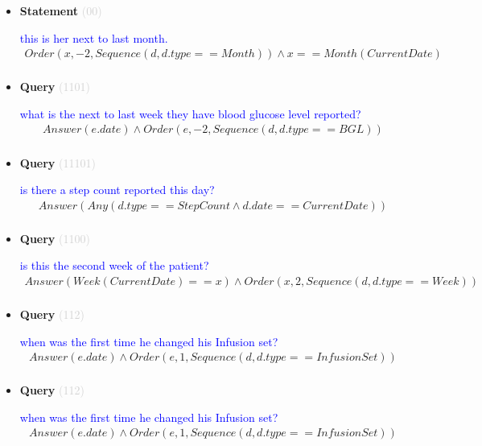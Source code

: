 \documentclass[11pt]{article}
\newcommand{\key}[1]{\textcolor{lightgray}{#1}}
\newcounter{CQuery}
\newcounter{CStatement}
\begin{document}
\begin{itemize}
\item
\textbf{Statement\theCStatement} \key{(00)} \addtocounter{CStatement}{1}
\textcolor{blue}{ this is her next to last month. }
\begin{multline*}
Order(x, -2, Sequence(d, d.type==Month)) \wedge x==Month(CurrentDate) \\ 
\end{multline*}


\item
\textbf{Query\theCQuery} \key{(1101)} \addtocounter{CQuery}{1}
\textcolor{blue}{ what is the next to last week they have blood glucose level reported? }
\begin{multline*}
Answer(e.date) \wedge Order(e, -2, Sequence(d, d.type==BGL)) \\ 
\end{multline*}


\item
\textbf{Query\theCQuery} \key{(11101)} \addtocounter{CQuery}{1}
\textcolor{blue}{ is there a step count reported this day? }
\begin{multline*}
Answer(Any(d.type==StepCount \wedge d.date==CurrentDate)) \\ 
\end{multline*}


\item
\textbf{Query\theCQuery} \key{(1100)} \addtocounter{CQuery}{1}
\textcolor{blue}{ is this the second week of the patient? }
\begin{multline*}
Answer(Week(CurrentDate)==x) \wedge Order(x, 2, Sequence(d, d.type==Week)) \\ 
\end{multline*}


\item
\textbf{Query\theCQuery} \key{(112)} \addtocounter{CQuery}{1}
\textcolor{blue}{ when was the first time he changed his Infusion set? }
\begin{multline*}
Answer(e.date) \wedge Order(e, 1, Sequence(d, d.type==InfusionSet)) \\ 
\end{multline*}


\item
\textbf{Query\theCQuery} \key{(112)} \addtocounter{CQuery}{1}
\textcolor{blue}{ when was the first time he changed his Infusion set? }
\begin{multline*}
Answer(e.date) \wedge Order(e, 1, Sequence(d, d.type==InfusionSet)) \\ 
\end{multline*}



\end{itemize}
\end{document}
